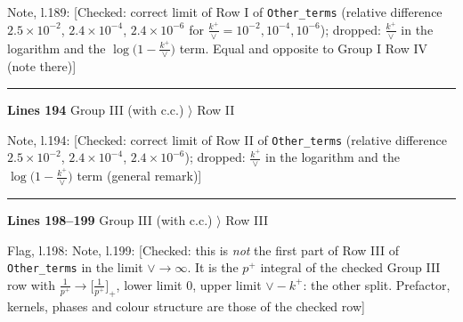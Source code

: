 \documentclass[10pt]{article}
\newenvironment{notebox}{\def\FrameCommand{{\color{notebar}\vrule width 1.5pt}\hspace{6pt}}\MakeFramed{\advance\hsize-\width\FrameRestore}\small}{\endMakeFramed}
\begin{document}
\begin{notebox}\textsf{\small Note, l.189:} [Checked: correct limit of Row I of \texttt{Other\_terms} (relative difference $2.5\times10^{-2}$, $2.4\times10^{-4}$, $2.4\times10^{-6}$ for $\frac{k^{+}}{\vee}=10^{-2},10^{-4},10^{-6}$); dropped: $\frac{k^{+}}{\vee}$ in the logarithm and the $\log\big(1-\frac{k^{+}}{\vee}\big)$ term. Equal and opposite to Group I Row IV (note there)]\end{notebox}
\noindent\rule{\linewidth}{0.3pt}\par\noindent\textbf{Lines 194} \quad \textsf{Group III (with c.c.) $\rangle$ Row II}\par
\begin{notebox}\textsf{\small Note, l.194:} [Checked: correct limit of Row II of \texttt{Other\_terms} (relative difference $2.5\times10^{-2}$, $2.4\times10^{-4}$, $2.4\times10^{-6}$); dropped: $\frac{k^{+}}{\vee}$ in the logarithm and the $\log\big(1-\frac{k^{+}}{\vee}\big)$ term (general remark)]\end{notebox}
\noindent\rule{\linewidth}{0.3pt}\par\noindent\textbf{Lines 198--199} \quad \textsf{Group III (with c.c.) $\rangle$ Row III} \par
\begin{notebox}\textsf{\small Flag, l.198:} \end{notebox}
\begin{notebox}\textsf{\small Note, l.199:} [Checked: this is \emph{not} the first part of Row III of \texttt{Other\_terms} in the limit $\vee\to\infty$. It is the $p^{+}$ integral of the checked Group III row with $\frac{1}{p^{+}}\to\big[\frac{1}{p^{+}}\big]_{+}$, lower limit $0$, upper limit $\vee-k^{+}$: the other split. Prefactor, kernels, phases and colour structure are those of the checked row]\end{notebox}
\end{document}
